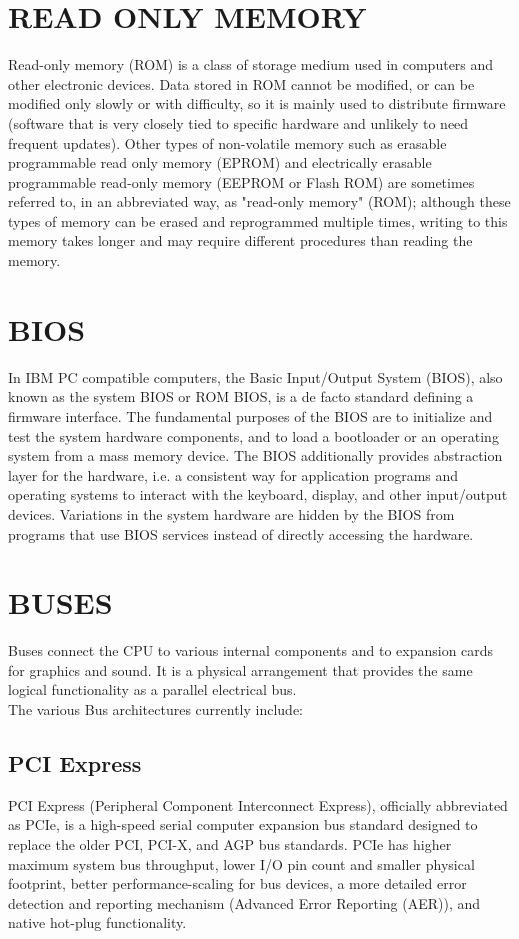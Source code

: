 \documentclass{article}
\begin{document}
\section{READ ONLY MEMORY}
Read-only memory (ROM) is a class of storage medium used in computers and other electronic devices. Data
stored in ROM cannot be modified, or can be modified only slowly or with difficulty, so it is mainly used to
distribute firmware (software that is very closely tied to specific hardware and unlikely to need frequent
updates). Other types of non-volatile memory such as erasable programmable read only memory (EPROM)
and electrically erasable programmable read-only memory (EEPROM or Flash ROM) are sometimes referred to,
in an abbreviated way, as "read-only memory" (ROM); although these types of memory can be erased and reprogrammed
multiple times, writing to this memory takes longer and may require different procedures than
reading the memory.
\section{BIOS}
In IBM PC compatible computers, the Basic Input/Output System (BIOS), also known as the system
BIOS or ROM BIOS, is a de facto standard defining a firmware interface. The fundamental purposes of the
BIOS are to initialize and test the system hardware components, and to load a bootloader or an operating
system from a mass memory device. The BIOS additionally provides abstraction layer for the hardware, i.e. a
consistent way for application programs and operating systems to interact with the keyboard, display, and other
input/output devices. Variations in the system hardware are hidden by the BIOS from programs that use BIOS
services instead of directly accessing the hardware.
\section{BUSES}
Buses connect the CPU to various internal components and to expansion cards for graphics and sound. It is a
physical arrangement that provides the same logical functionality as a parallel electrical bus.\\
The various Bus architectures currently include:
\subsection{PCI Express}
 PCI Express (Peripheral Component Interconnect Express), officially abbreviated as PCIe, is
 a high-speed serial computer expansion bus standard designed to replace the older PCI, PCI-X,
 and AGP bus standards. PCIe has higher maximum system bus throughput, lower I/O pin count and smaller physical footprint,
 better performance-scaling for bus devices, a more detailed error detection and reporting mechanism
 (Advanced Error Reporting (AER)), and native hot-plug functionality.
\end{document}
